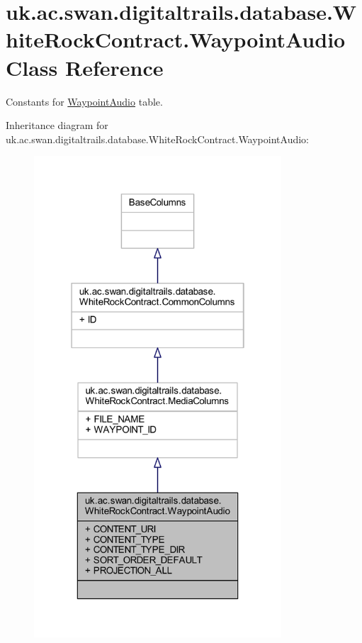 \hypertarget{classuk_1_1ac_1_1swan_1_1digitaltrails_1_1database_1_1_white_rock_contract_1_1_waypoint_audio}{\section{uk.\+ac.\+swan.\+digitaltrails.\+database.\+White\+Rock\+Contract.\+Waypoint\+Audio Class Reference}
\label{classuk_1_1ac_1_1swan_1_1digitaltrails_1_1database_1_1_white_rock_contract_1_1_waypoint_audio}
}


Constants for \hyperlink{classuk_1_1ac_1_1swan_1_1digitaltrails_1_1database_1_1_white_rock_contract_1_1_waypoint_audio}{Waypoint\+Audio} table.  




Inheritance diagram for uk.\+ac.\+swan.\+digitaltrails.\+database.\+White\+Rock\+Contract.\+Waypoint\+Audio\+:
\nopagebreak
\begin{figure}[H]
\begin{center}
\leavevmode
\includegraphics[width=262pt]{classuk_1_1ac_1_1swan_1_1digitaltrails_1_1database_1_1_white_rock_contract_1_1_waypoint_audio__inherit__graph}
\end{center}
\end{figure}


